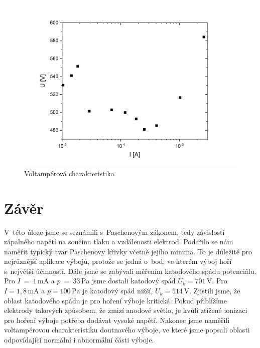 \documentclass[a4paper,12pt]{article}
\begin{document}
\begin{figure}[h!]
	\centering
	\includegraphics[width=145mm]{VAodpor.png}
	\caption{Voltampérová charakteristika}
	\label{VAodpor}
\end{figure}

\clearpage
\section{Závěr}
V~této úloze jsme se seznámili s~Paschenovým zákonem, tedy závislostí zápalného napětí na součinu tlaku a vzdálenosti elektrod. Podařilo se nám naměřit typický tvar Paschenovy křivky včetně jejího minima. To je důležité pro nejrůznější aplikace výbojů, protože se jedná o~bod, ve kterém výboj hoří s~největší účinností.
Dále jsme se zabývali měřením katodového spádu potenciálu. Pro $I~=~1\,\si{\milli\ampere}$ a $p~=~33\,\si{\pascal}$ jsme dostali katodový spád $U_k = 701\,\si{\volt}$. Pro $I = 1,8\,\si{\milli\ampere}$ a $p = 100\,\si{\pascal}$ je katodový spád nižší,  $U_k = 514\,\si{\volt}$. Zjistili jsme, že oblast katodového spádu je pro hoření výboje kritická. Pokud přiblížíme elektrody takových způsobem, že zmizí anodové světlo, je kvůli ztížené ionizaci pro hoření výboje potřeba dodávat vysoké napětí. Nakonec jsme naměřili voltampérovou charakteristiku doutnavého výboje, ve které jsme popsali oblasti odpovídající normální i abnormální části výboje.
\end{document}
